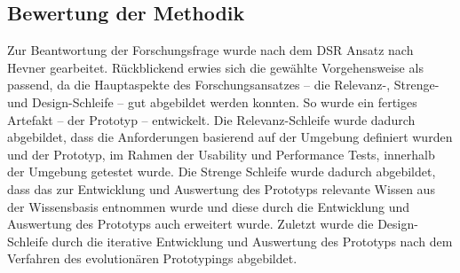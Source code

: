 \subsection{Bewertung der Methodik}
Zur Beantwortung der Forschungsfrage wurde nach dem \ac{DSR} Ansatz nach Hevner \cite{Hevner2004} gearbeitet. Rückblickend erwies sich die gewählte Vorgehensweise als passend, da die Hauptaspekte des Forschungsansatzes – die Relevanz-, Strenge- und Design-Schleife – gut abgebildet werden konnten. So wurde ein fertiges Artefakt – der Prototyp – entwickelt. Die Relevanz-Schleife wurde dadurch abgebildet, dass die Anforderungen basierend auf der Umgebung definiert wurden und der Prototyp, im Rahmen der Usability und Performance Tests, innerhalb der Umgebung getestet wurde. Die Strenge Schleife wurde dadurch abgebildet, dass das zur Entwicklung und Auswertung des Prototyps relevante Wissen aus der Wissensbasis entnommen wurde und diese durch die Entwicklung und Auswertung des Prototyps auch erweitert wurde. Zuletzt wurde die Design-Schleife durch die iterative Entwicklung und Auswertung des Prototyps nach dem Verfahren des evolutionären Prototypings abgebildet.
